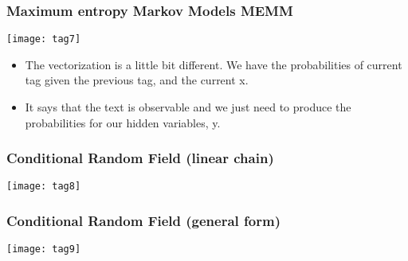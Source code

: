 \begin{frame}[fragile]
  \frametitle{Maximum entropy Markov Models MEMM}

\begin{center}
\texttt{[image: tag7]}
\end{center}

  \begin{itemize}
\item The vectorization is a little bit different. We have the probabilities of current tag given the previous tag, and the current x. 
\item  It says that the text is observable and we just need to produce the probabilities for our hidden variables, y.
  	  \end{itemize}
 \end{frame} 
  
\begin{frame}[fragile]
  \frametitle{Conditional Random Field (linear chain)}

\begin{center}
\texttt{[image: tag8]}
\end{center}

 \end{frame} 
 
\begin{frame}[fragile]
  \frametitle{Conditional Random Field (general form)}

\begin{center}
\texttt{[image: tag9]}
\end{center}

 \end{frame} 
  
  
  
